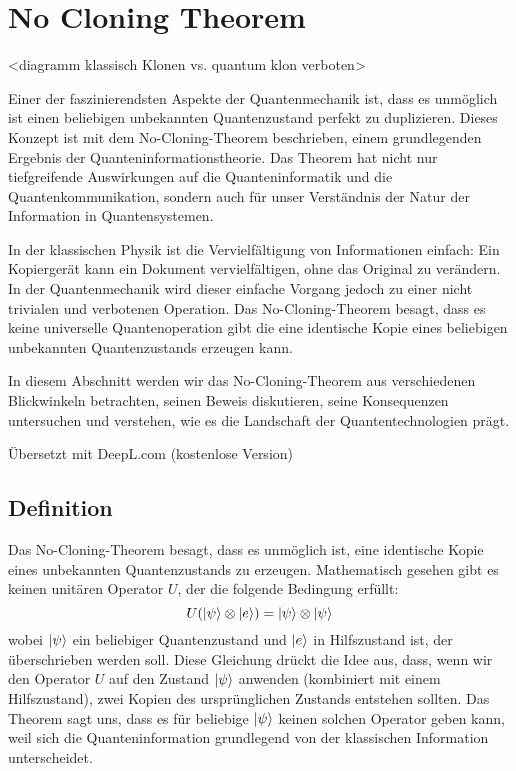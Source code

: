 \section{No Cloning Theorem} \label{sec:no-cloning}

<diagramm klassisch Klonen vs. quantum klon verboten>

Einer der faszinierendsten Aspekte der Quantenmechanik ist, dass es unmöglich ist
einen beliebigen unbekannten Quantenzustand perfekt zu duplizieren.
Dieses Konzept ist mit dem No-Cloning-Theorem beschrieben, einem grundlegenden Ergebnis der Quanteninformationstheorie.
Das Theorem hat nicht nur tiefgreifende Auswirkungen auf die Quanteninformatik und die Quantenkommunikation,
sondern auch für unser Verständnis der Natur der Information in Quantensystemen.

In der klassischen Physik ist die Vervielfältigung von Informationen einfach:
Ein Kopiergerät kann ein Dokument vervielfältigen, ohne das Original zu verändern.
In der Quantenmechanik wird dieser einfache Vorgang jedoch zu einer nicht trivialen und verbotenen Operation.
Das No-Cloning-Theorem besagt, dass es keine universelle Quantenoperation gibt
die eine identische Kopie eines beliebigen unbekannten Quantenzustands erzeugen kann.

In diesem Abschnitt werden wir das No-Cloning-Theorem aus verschiedenen Blickwinkeln betrachten, seinen Beweis diskutieren,
seine Konsequenzen untersuchen und verstehen, wie es die Landschaft der Quantentechnologien prägt.

Übersetzt mit DeepL.com (kostenlose Version)
\subsection{Definition}\label{subsec:definition}
Das No-Cloning-Theorem besagt, dass es unmöglich ist, eine identische Kopie eines unbekannten Quantenzustands zu erzeugen.
Mathematisch gesehen gibt es keinen unitären Operator $U$, der die folgende Bedingung erfüllt:
\begin{equation}
    U(\lvert\psi\rangle\otimes\lvert e\rangle)=\lvert\psi\rangle\otimes\lvert\psi\rangle\label {eq:cloning_assertion}
\end{equation}
wobei $\lvert\psi\rangle$ ein beliebiger Quantenzustand und $\lvert e\rangle$ in Hilfszustand ist, der überschrieben werden soll.
Diese Gleichung drückt die Idee aus, dass, wenn wir den Operator $U$ auf den Zustand $\lvert\psi\rangle$ anwenden
(kombiniert mit einem Hilfszustand), zwei Kopien des ursprünglichen Zustands entstehen sollten.
Das Theorem sagt uns, dass es für beliebige $\lvert\psi\rangle$ keinen solchen Operator geben kann,
weil sich die Quanteninformation grundlegend von der klassischen Information unterscheidet.
